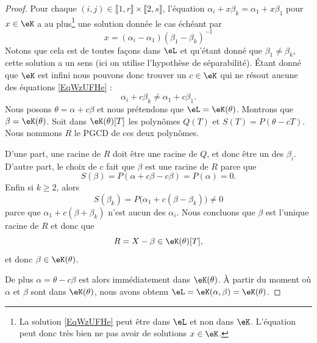 \begin{proof}
    Pour chaque \( (i,j)\in\llbracket 1,r\rrbracket\times \llbracket 2,s\rrbracket\), l'équation \( \alpha_i+x\beta_k=\alpha_1+x\beta_1\) pour \( x\in \eK\) a au plus\footnote{La solution \eqref{EqWzUFHe} peut être dans \( \eL\) et non dans \( \eK\). L'équation peut donc très bien ne pas avoir de solutions \( x\in \eK\).} une solution donnée le cas échéant par
    \begin{equation}    \label{EqWzUFHe}
        x=(\alpha_i-\alpha_1)(\beta_1-\beta_k)^{-1}
    \end{equation}
    Notons que cela est de toutes façons dans \( \eL\) et qu'étant donné que \( \beta_1\neq \beta_k\), cette solution a un sens (ici on utilise l'hypothèse de séparabilité). Étant donné que \( \eK\) est infini nous pouvons donc trouver un \( c\in \eK\) qui ne résout aucune des équations \eqref{EqWzUFHe} :
    \begin{equation}
        \alpha_i+c\beta_k\neq \alpha_1+c\beta_1.
    \end{equation}
    Nous posons \( \theta=\alpha+c\beta\) et nous prétendons que \( \eL=\eK(\theta)\). Montrons que \( \beta=\eK(\theta)\). Soit dans \( \eK(\theta)[T]\) les polynômes \( Q(T)\) et \( S(T)=P(\theta-cT)\). Nous nommons \( R\) le PGCD de ces deux polynômes.
    
    D'une part, une racine de \( R\) doit être une racine de \( Q\), et donc être un des \( \beta_i\). D'autre part, le choix de \( c\) fait que \( \beta\) est une racine de \( R\) parce que
    \begin{equation}
        S(\beta)=P(\alpha+c\beta-c\beta)=P(\alpha)=0.
    \end{equation}
    Enfin si \( k\geq 2\), alors
    \begin{equation}
        S(\beta_k)=P\big(\alpha_1+c(\beta-\beta_k)\big)\neq 0
    \end{equation}
    parce que \( \alpha_1+c(\beta+\beta_k)\) n'est aucun des \( \alpha_i\). Nous concluons que \( \beta\) est l'unique racine de \( R\) et donc que 
    \begin{equation}
        R=X-\beta\in \eK(\theta)[T],
    \end{equation}
    et donc \( \beta\in \eK(\theta)\).

    De plus \( \alpha=\theta-c\beta\) est alors immédiatement dans \( \eK(\theta)\). À partir du moment où \( \alpha\) et \( \beta\) sont dans \( \eK(\theta)\), nous avons obtenu \( \eL=\eK(\alpha,\beta)=\eK(\theta)\).

\end{proof}

